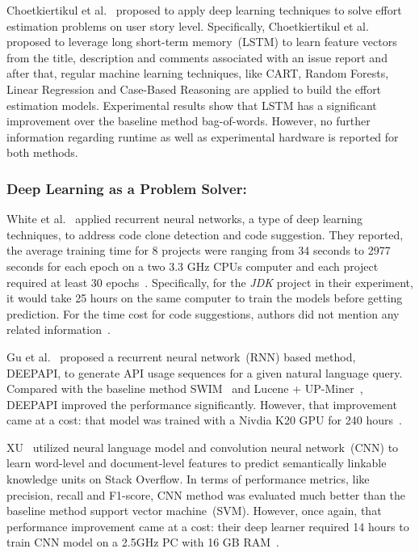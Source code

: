 \documentclass[sigconf]{acmart}
\theoremstyle{break}
\begin{document}
 Choetkiertikul et al.~\cite{choetkiertikul2016deep} proposed to apply deep learning techniques
 to solve effort estimation problems on user story level. 
 Specifically,  Choetkiertikul et al. ~\cite{choetkiertikul2016deep} proposed to leverage
 long short-term memory~(LSTM) to learn feature vectors from the title,
 description and comments associated with an issue report and after that,
 regular machine learning techniques, like CART, Random Forests, 
 Linear Regression and Case-Based Reasoning are applied to build the effort
 estimation models. Experimental results show that
 LSTM has a 
 significant improvement over the baseline method bag-of-words.
 However, no further information regarding
 runtime as well as experimental hardware  is reported for both methods.
 
 
\noindent
\subsubsection{Deep Learning as  a Problem Solver:}

 White et al.~\cite{white2015toward, white2016deep} applied
 recurrent neural networks, a type of  deep learning techniques, 
 to address code clone detection and code suggestion. They reported,
 the average training time for 8 projects were ranging from 34 seconds
  to 2977 seconds for each epoch on a two 3.3 GHz
 CPUs computer and each project required at least 30 epochs~\cite{white2016deep}.
Specifically, for the {\it JDK} project in their experiment, it would take 25 hours 
 on the same computer to train the models before getting prediction.
 For the time cost for code suggestions, authors did not mention any related information~\cite{white2015toward}.

Gu et al.~\cite{gu2016deep} proposed  a recurrent neural network~(RNN)
 based method, D{\scriptsize EEP}API, to generate API usage sequences for a given natural language query. 
 Compared with the baseline method { SWIM}~\cite{raghothaman2016swim} and 
 { Lucene + UP-Miner}~\cite{wang2013mining},  D{\scriptsize EEP}API   improved the performance significantly.
 However, that improvement came at a cost: that  model was trained with a Nivdia K20 GPU for  240 hours~\cite{gu2016deep}.
 
 XU~\cite{xu2016predicting} utilized neural language model and  
 convolution neural network~(CNN) to  learn word-level and document-level features to
 predict semantically linkable knowledge units on Stack Overflow. 
 In terms of performance metrics, like precision, recall and F1-score,
 CNN method was evaluated much better than 
 the baseline method support vector machine~(SVM). 
 However, once again, that performance improvement came at a cost:
 their deep learner required  
 14 hours to train CNN model on a 2.5GHz PC with 16 GB RAM~\cite{xu2016predicting}.
 
\end{document}
